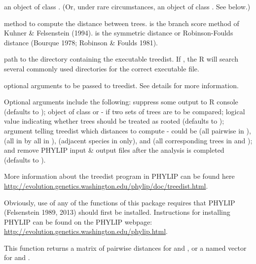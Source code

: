 \documentclass[a4paper]{book}
\begin{document}
%
\begin{Arguments}
\begin{ldescription}
\item[\code{trees}] an object of class . (Or, under rare circumstances, an object of class . See below.)
\item[\code{method}] method to compute the distance between trees.  is the branch score method of Kuhner \& Felsenstein (1994).  is the symmetric distance or Robinson-Foulds distance (Bourque 1978; Robinson \& Foulds 1981).
\item[\code{path}] path to the directory containing the executable treedist. If , the R will search several commonly used directories for the correct executable file.
\item[\code{...}] optional arguments to be passed to treedist. See details for more information.
\end{ldescription}
\end{Arguments}
%
\begin{Details}\relax
Optional arguments include the following:  suppress some output to R console (defaults to );  object of class  or  - if two sets of trees are to be compared;  logical value indicating whether trees should be treated as rooted (defaults to );  argument telling treedist which distances to compute - could be  (all pairwise in ),  (all in  by all in ),  (adjacent species in  only), and  (all corresponding trees in  and ); and  remove PHYLIP input \& output files after the analysis is completed (defaults to ).

More information about the treedist program in PHYLIP can be found here \url{http://evolution.genetics.washington.edu/phylip/doc/treedist.html}.

Obviously, use of any of the functions of this package requires that PHYLIP (Felsenstein 1989, 2013) should first be installed. Instructions for installing PHYLIP can be found on the PHYLIP webpage: \url{http://evolution.genetics.washington.edu/phylip.html}.
\end{Details}
%
\begin{Value}
This function returns a matrix of pairwise distances for  and , or a named vector for  and .
\end{Value}
\end{document}
